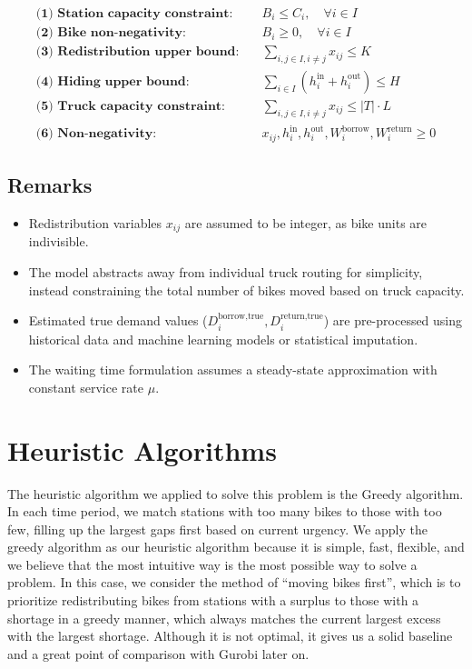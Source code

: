 \documentclass[11pt,a4paper]{article}
\begin{document}
\begin{align*}
\textbf{(1) Station capacity constraint:} & \quad B_i \leq C_i, \quad \forall i \in I \\
\textbf{(2) Bike non-negativity:} & \quad B_i \geq 0, \quad \forall i \in I \\
\textbf{(3) Redistribution upper bound:} & \quad \sum_{i,j \in I, i \ne j} x_{ij} \leq K \\
\textbf{(4) Hiding upper bound:} & \quad \sum_{i \in I} \left(h_i^{\text{in}} + h_i^{\text{out}}\right) \leq H \\
\textbf{(5) Truck capacity constraint:} & \quad \sum_{i,j \in I, i \ne j} x_{ij} \leq |T| \cdot L \\
\textbf{(6) Non-negativity:} & \quad x_{ij}, h_i^{\text{in}}, h_i^{\text{out}}, W_i^{\text{borrow}}, W_i^{\text{return}} \geq 0
\end{align*}

\subsection*{Remarks}

\begin{itemize}
    \item Redistribution variables $x_{ij}$ are assumed to be integer, as bike units are indivisible.
    \item The model abstracts away from individual truck routing for simplicity, instead constraining the total number of bikes moved based on truck capacity.
    \item Estimated true demand values ($D_i^{\text{borrow,true}}, D_i^{\text{return,true}}$) are pre-processed using historical data and machine learning models or statistical imputation.
    \item The waiting time formulation assumes a steady-state approximation with constant service rate $\mu$.
\end{itemize}


\section{Heuristic Algorithms}

The heuristic algorithm we applied to solve this problem is the Greedy algorithm. In each time period, we match stations with too many bikes to those with too few, filling up the largest gaps first based on current urgency.
We apply the greedy algorithm as our heuristic algorithm because it is simple, fast, flexible, and we believe that the most intuitive way is the most possible way to solve a problem. 
In this case, we consider the method of “moving bikes first”, which is to prioritize redistributing bikes from stations with a surplus to those with a shortage in a greedy manner, which always matches the current largest excess with the largest shortage.
Although it is not optimal, it gives us a solid baseline and a great point of comparison with Gurobi later on.
\end{document}
